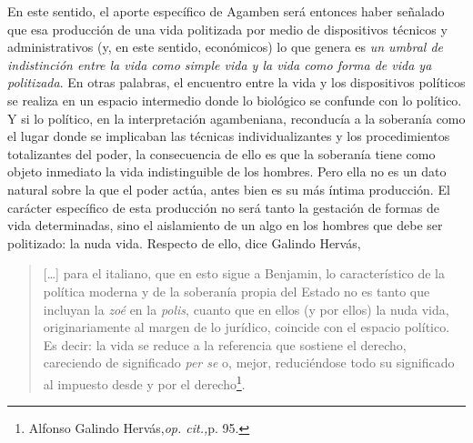 \documentclass{book}
\begin{document}
En este sentido, el aporte específico de Agamben será entonces haber
señalado que esa producción de una vida politizada por medio de
dispositivos técnicos y administrativos (y, en este sentido, económicos)
lo que genera es \emph{un umbral de indistinción entre la vida como
simple vida y la vida como forma de vida ya politizada}. En otras
palabras, el encuentro entre la vida y los dispositivos políticos se
realiza en un espacio intermedio donde lo biológico se confunde con lo
político. Y si lo político, en la interpretación agambeniana, reconducía
a la soberanía como el lugar donde se implicaban las técnicas
individualizantes y los procedimientos totalizantes del poder, la
consecuencia de ello es que la soberanía tiene como objeto inmediato la
vida indistinguible de los hombres. Pero ella no es un dato natural
sobre la que el poder actúa, antes bien es su más íntima producción. El
carácter específico de esta producción no será tanto la gestación de
formas de vida determinadas, sino el aislamiento de un algo en los
hombres que debe ser politizado: la nuda vida. Respecto de ello, dice
Galindo Hervás,

\begin{quote}
{[}\ldots{]} para el italiano, que en esto sigue a Benjamin, lo
característico de la política moderna y de la soberanía propia del
Estado no es tanto que incluyan la \emph{zoé} en la \emph{polis}, cuanto
que en ellos (y por ellos) la nuda vida, originariamente al margen de lo
jurídico, coincide con el espacio político. Es decir: la vida se reduce
a la referencia que sostiene el derecho, careciendo de significado
\emph{per se} o, mejor, reduciéndose todo su significado al impuesto
desde y por el derecho\footnote{Alfonso Galindo Hervás,\emph{op.
  cit.,}p. 95.}.
\end{quote}
\end{document}
